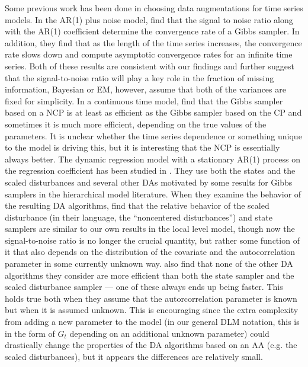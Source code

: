 \documentclass{article}
\begin{document}
Some previous work has been done in choosing data augmentations for time series models. In the AR(1) plus noise model, \citet{pitt1999analytic} find that the signal to noise ratio along with the AR(1) coefficient determine the convergence rate of a Gibbs sampler. In addition, they find that as the length of the time series increases, the convergence rate slows down and compute asymptotic convergence rates for an infinite time series. Both of these results are consistent with our findings and further suggest that the signal-to-noise ratio will play a key role in the fraction of missing information, Bayesian or EM, however, \citet{pitt1999analytic} assume that both of the variances are fixed for simplicity. In a continuous time model, \citet{roberts2004bayesian} find that the Gibbs sampler based on a NCP is at least as efficient as the Gibbs sampler based on the CP and sometimes it is much more efficient, depending on the true values of the parameters. It is unclear whether the time series dependence or something unique to the model is driving this, but it is interesting that the NCP is essentially always better. The dynamic regression model with a stationary AR(1) process on the regression coefficient has been studied in \citet{fruhwirth2004efficient}. They use both the states and the scaled disturbances and several other DAs motivated by some results for Gibbs samplers in the hierarchical model literature. When they examine the behavior of the resulting DA algorithms, \citet{fruhwirth2004efficient} find that the relative behavior of the scaled disturbance (in their language, the ``noncentered disturbances'') and state samplers are similar to our own results in the local level model, though now the signal-to-noise ratio is no longer the crucial quantity, but rather some function of it that also depends on the distribution of the covariate and the autocorrelation parameter in some currently unknown way. \citet{fruhwirth2004efficient} also find that none of the other DA algorithms they consider are more efficient than both the state sampler and the scaled disturbance sampler --- one of these always ends up being faster. This holds true both when they assume that the autorcorrelation parameter is known but when it is assumed unknown. This is encouraging since the extra complexity from adding a new parameter to the model (in our general DLM notation, this is in the form of $G_t$ depending on an additional unknown parameter) could drastically change the properties of the DA algorithms based on an AA (e.g. the scaled disturbances), but it appears the differences are relatively small.
\end{document}
